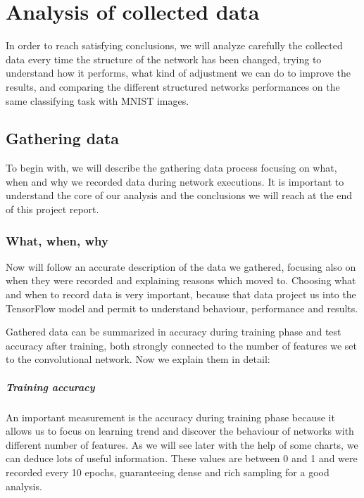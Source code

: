 \chapter{Analysis of collected data}\label{ch:data_analysis}

In order to reach satisfying conclusions, we will analyze carefully the collected data every time the structure of the network has been changed, trying to understand how it performs, what kind of adjustment we can do to improve the results, and comparing the different structured networks performances on the same classifying task with MNIST images.

\section{Gathering data}

To begin with, we will describe the gathering data process focusing on what, when and why we recorded data during network executions. It is important to understand the core of our analysis and the conclusions we will reach at the end of this project report.

\subsection{What, when, why}

Now will follow an accurate description of the data we gathered, focusing also on when they were recorded and explaining reasons which moved to. Choosing what and when to record data is very important, because that data project us into the TensorFlow model and permit to understand behaviour, performance and results.

Gathered data can be summarized in accuracy during training phase and test accuracy after training, both strongly connected to the number of features we set to the convolutional network. Now we explain them in detail:

\paragraph{Training accuracy}

An important measurement is the accuracy during training phase because it allows us to focus on learning trend and discover the behaviour of networks with different number of features. As we will see later with the help of some charts, we can deduce lots of useful information. These values are between 0 and 1 and were recorded every 10 epochs, guaranteeing dense and rich sampling for a good analysis.

